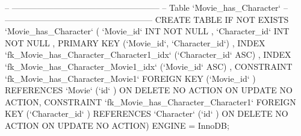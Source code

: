 \begin{spverbatim}
-- -----------------------------------------------------
-- Table `Movie_has_Character`
-- -----------------------------------------------------
CREATE  TABLE IF NOT EXISTS `Movie_has_Character` (
  `Movie_id` INT NOT NULL ,
  `Character_id` INT NOT NULL ,
  PRIMARY KEY (`Movie_id`, `Character_id`) ,
  INDEX `fk_Movie_has_Character_Character1_idx` (`Character_id` ASC) ,
  INDEX `fk_Movie_has_Character_Movie1_idx` (`Movie_id` ASC) ,
  CONSTRAINT `fk_Movie_has_Character_Movie1`
    FOREIGN KEY (`Movie_id` )
    REFERENCES `Movie` (`id` )
    ON DELETE NO ACTION
    ON UPDATE NO ACTION,
  CONSTRAINT `fk_Movie_has_Character_Character1`
    FOREIGN KEY (`Character_id` )
    REFERENCES `Character` (`id` )
    ON DELETE NO ACTION
    ON UPDATE NO ACTION)
ENGINE = InnoDB;
\end{spverbatim}
\newpage
